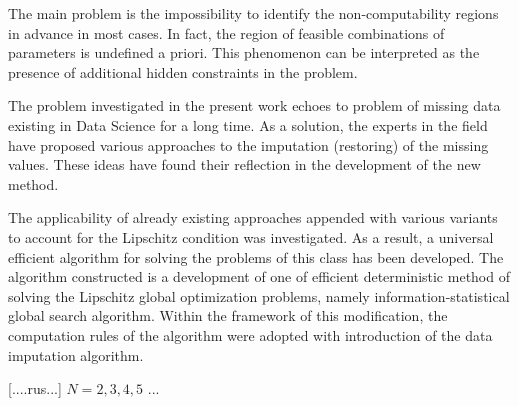 \documentclass[runningheads]{llncs}
\begin{document}
The main problem is the impossibility to identify the non-computability regions in advance in most cases. In fact, the region of feasible combinations of parameters is undefined a priori. This phenomenon can be interpreted as the presence of additional hidden constraints in the problem.

The problem investigated in the present work echoes to problem of missing data existing in Data Science for a long time. As a solution, the experts in the field have proposed various approaches to the imputation (restoring) of the missing values. These ideas have found their reflection in the development of the new method.

The applicability of already existing approaches appended with various variants to account for the Lipschitz condition was investigated. As a result, a universal efficient algorithm for solving the problems of this class has been developed. The algorithm constructed is a development of one of efficient deterministic method of solving the Lipschitz global optimization problems, namely information-statistical global search algorithm. Within the framework of this modification, the computation rules of the algorithm were adopted with introduction of the data imputation algorithm.

[....rus...] $N = 2,3,4,5$ ...


%
%
%


\end{document}
